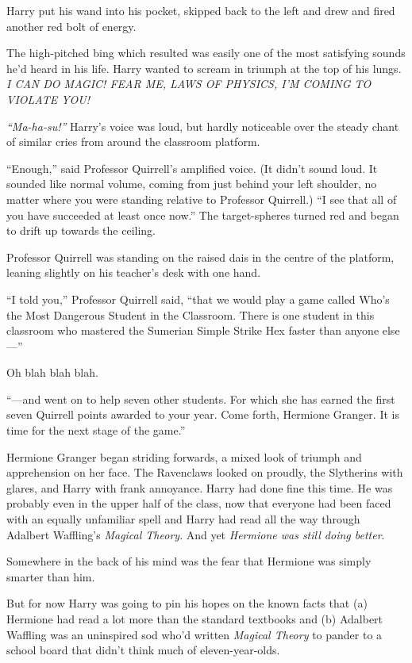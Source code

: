 Harry put his wand into his pocket, skipped back to the left and drew
and fired another red bolt of energy.

The high-pitched bing which resulted was easily one of the most
satisfying sounds he'd heard in his life. Harry wanted to scream in
triumph at the top of his lungs. \emph{I CAN DO MAGIC! FEAR ME, LAWS OF
PHYSICS, I'M COMING TO VIOLATE YOU!}

\emph{``Ma-ha-su!''} Harry's voice was loud, but hardly noticeable over
the steady chant of similar cries from around the classroom platform.

``Enough,'' said Professor Quirrell's amplified voice. (It didn't sound
loud. It sounded like normal volume, coming from just behind your left
shoulder, no matter where you were standing relative to Professor
Quirrell.) ``I see that all of you have succeeded at least once now.''
The target-spheres turned red and began to drift up towards the ceiling.

Professor Quirrell was standing on the raised dais in the centre of the
platform, leaning slightly on his teacher's desk with one hand.

``I told you,'' Professor Quirrell said, ``that we would play a game
called Who's the Most Dangerous Student in the Classroom. There is one
student in this classroom who mastered the Sumerian Simple Strike Hex
faster than anyone else---''

Oh blah blah blah.

``---and went on to help seven other students. For which she has earned
the first seven Quirrell points awarded to your year. Come forth,
Hermione Granger. It is time for the next stage of the game.''

Hermione Granger began striding forwards, a mixed look of triumph and
apprehension on her face. The Ravenclaws looked on proudly, the
Slytherins with glares, and Harry with frank annoyance. Harry had done
fine this time. He was probably even in the upper half of the class, now
that everyone had been faced with an equally unfamiliar spell and Harry
had read all the way through Adalbert Waffling's \emph{Magical Theory}.
And yet \emph{Hermione was still doing better}.

Somewhere in the back of his mind was the fear that Hermione was simply
smarter than him.

But for now Harry was going to pin his hopes on the known facts that (a)
Hermione had read a lot more than the standard textbooks and (b)
Adalbert Waffling was an uninspired sod who'd written \emph{Magical
Theory} to pander to a school board that didn't think much of
eleven-year-olds.

